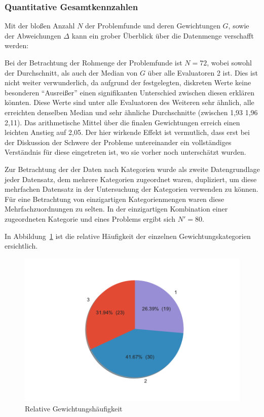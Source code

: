 \documentclass[
  12pt,
  ngerman,
  a4paper,
]{article}
\begin{document}
\hypertarget{quantitative-gesamtkennzahlen}{%
\subsubsection{Quantitative
Gesamtkennzahlen}\label{quantitative-gesamtkennzahlen}}

Mit der bloßen Anzahl \(N\) der Problemfunde und deren Gewichtungen
\(G\), sowie der Abweichungen \(\Delta\) kann ein grober Überblick über
die Datenmenge verschafft werden:

Bei der Betrachtung der Rohmenge der Problemfunde ist \(N=72\), wobei
sowohl der Durchschnitt, als auch der Median von \(G\) über alle
Evaluatoren 2 ist. Dies ist nicht weiter verwunderlich, da aufgrund der
festgelegten, diskreten Werte keine besonderen ``Ausreißer'' einen
signifikanten Unterschied zwischen diesen erklären könnten. Diese Werte
sind unter alle Evaluatoren des Weiteren sehr ähnlich, alle erreichten
denselben Median und sehr ähnliche Durchschnitte (zwischen 1,93
\textbar{} 1,96 \textbar{} 2,11). Das arithmetische Mittel über die
finalen Gewichtungen erreich einen leichten Anstieg auf 2,05. Der hier
wirkende Effekt ist vermutlich, dass erst bei der Diskussion der Schwere
der Probleme untereinander ein vollständiges Verständnis für diese
eingetreten ist, wo sie vorher noch unterschätzt wurden.

Zur Betrachtung der der Daten nach Kategorien wurde als zweite
Datengrundlage jeder Datensatz, dem mehrere Kategorien zugeordnet waren,
dupliziert, um diese mehrfachen Datensatz in der Untersuchung der
Kategorien verwenden zu können. Für eine Betrachtung von einzigartigen
Kategorienmengen waren diese Mehrfachzuordnungen zu selten. In der
einzigartigen Kombination einer zugeordneten Kategorie und eines
Problems ergibt sich \(N'=80\).

In Abbildung~\ref{fig:rel-weights} ist die relative Häufigkeit der
einzelnen Gewichtungskategorien ersichtlich.

\begin{figure}
\hypertarget{fig:rel-weights}{%
\centering
\includegraphics{./tex2pdf.-930e6666e1221838/388ffccc4f22fb151ed851faca741ed1f470f666.pdf}
\caption{Relative Gewichtungshäufigkeit}\label{fig:rel-weights}
}
\end{figure}
\end{document}
